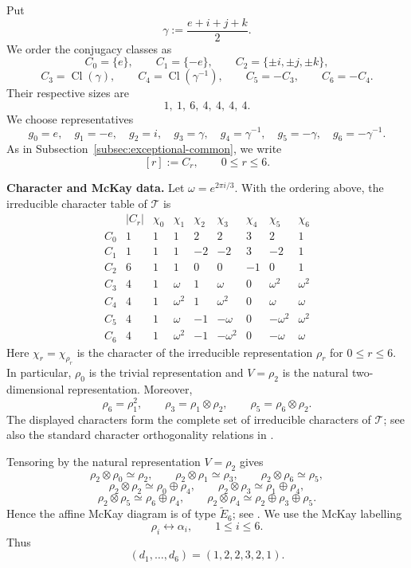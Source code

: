 \documentclass[a4paper,reqno]{amsart}
\theoremstyle{plain} %
\theoremstyle{definition} %
\theoremstyle{remark} %
\newcommand{\1}{\mathds{1}}   %
\begin{document}
Put
\[
\gamma:=\frac{e+i+j+k}{2}.
\]
We order the conjugacy classes as
\[
C_0=\{e\},
\qquad
C_1=\{-e\},
\qquad
C_2=\{\pm i,\pm j,\pm k\},
\]
\[
C_3=\operatorname{Cl}(\gamma),
\qquad
C_4=\operatorname{Cl}(\gamma^{-1}),
\qquad
C_5=-C_3,
\qquad
C_6=-C_4.
\]
Their respective sizes are
\[
1,\ 1,\ 6,\ 4,\ 4,\ 4,\ 4.
\]
We choose representatives
\[
g_0=e,\quad
g_1=-e,\quad
g_2=i,\quad
g_3=\gamma,\quad
g_4=\gamma^{-1},
\quad
g_5=-\gamma,\quad
g_6=-\gamma^{-1}.
\]
As in Subsection~\ref{subsec:exceptional-common}, we write
\[
[r]:=C_r,
\qquad
0\le r\le6.
\]

\medskip

\noindent\textbf{Character and McKay data.}
Let $\omega=e^{2\pi i/3}$. 
With the ordering above, the irreducible character table of
\(\mathcal T\) is
\[
\begin{array}{c|c|ccccccc}
 & |C_r|
 & \chi_0 & \chi_1 & \chi_2 & \chi_3
 & \chi_4 & \chi_5 & \chi_6 \\ \hline
C_0 & 1 & 1 & 1 & 2 & 2 & 3 & 2 & 1\\
C_1 & 1 & 1 & 1 & -2 & -2 & 3 & -2 & 1\\
C_2 & 6 & 1 & 1 & 0 & 0 & -1 & 0 & 1\\
C_3 & 4 & 1 & \omega & 1 & \omega
    & 0 & \omega^2 & \omega^2\\
C_4 & 4 & 1 & \omega^2 & 1 & \omega^2
    & 0 & \omega & \omega\\
C_5 & 4 & 1 & \omega & -1 & -\omega
    & 0 & -\omega^2 & \omega^2\\
C_6 & 4 & 1 & \omega^2 & -1 & -\omega^2
    & 0 & -\omega & \omega
\end{array}
\]
Here \(\chi_r=\chi_{\rho_r}\) is the character of the irreducible representation $\rho_r$ for $0\le r\le 6$. In particular, \(\rho_0\) is the trivial representation and $V=\rho_2$ is the natural two-dimensional representation.  Moreover,
\[
\rho_6=\rho_1^2,
\qquad
\rho_3=\rho_1\otimes\rho_2,
\qquad
\rho_5=\rho_6\otimes\rho_2.
\]
The displayed characters form the complete set of irreducible
characters of \(\mathcal T\); see also the standard character
orthogonality relations in \cite[Sec.~2.3]{Serre77}.

Tensoring by the natural representation \(V=\rho_2\) gives
\[
\rho_2\otimes\rho_0\simeq\rho_2,
\qquad
\rho_2\otimes\rho_1\simeq\rho_3,
\qquad
\rho_2\otimes\rho_6\simeq\rho_5,
\]
\[
\rho_2\otimes\rho_2\simeq\rho_0\oplus\rho_4,
\qquad
\rho_2\otimes\rho_3\simeq\rho_1\oplus\rho_4,
\]
\[
\rho_2\otimes\rho_5\simeq\rho_6\oplus\rho_4,
\qquad
\rho_2\otimes\rho_4
\simeq
\rho_2\oplus\rho_3\oplus\rho_5.
\]
Hence the affine McKay diagram is of type \(\widetilde E_6\);
see \cite{McKay}. We use the McKay labelling
\[
\rho_i\longleftrightarrow\alpha_i,
\qquad
1\le i\le6.
\]
Thus
\[
(d_1,\ldots,d_6)=(1,2,2,3,2,1).
\]
\end{document}
